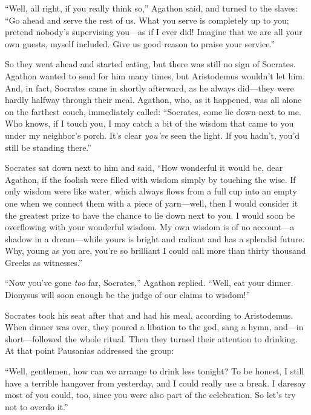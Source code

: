 “Well, all right, if you really think so,” Agathon said, and turned to
the slaves: “Go ahead and serve the rest of us. What you serve is
completely up to you; pretend nobody’s supervising you---as if I ever
did! Imagine that we are all your own guests, myself included. Give us
good reason to praise your service.”

So they went ahead and started eating, but there was still no sign of
Socrates. Agathon wanted to send for him many times, but Aristodemus
wouldn’t let him. And, in fact, Socrates came in shortly afterward, as
he always did---they were hardly halfway through their meal. Agathon,
who, as it happened, was all alone on the farthest couch, immediately
called: “Socrates, come lie down next to me. Who knows, if I touch you,
I may catch a bit of the wisdom that came to you under my
neighbor’s porch. It’s clear {\em you’ve} seen the light. If you hadn’t,
you’d still be standing there.”

Socrates sat down next to him and said, “How wonderful it would be, dear
Agathon, if the foolish were filled with wisdom simply by touching the
wise. If only wisdom were like water, which always flows from a full cup
into an empty one when we connect them with a piece of yarn---well, 
then I would consider it the greatest prize to have the chance
to lie down next to you. I would soon be overflowing with your wonderful
wisdom. My own wisdom is of no account---a shadow in a dream---while
yours is bright and radiant and has a splendid future. Why, young as you
are, you’re so brilliant I could call more than thirty thousand Greeks
as witnesses.”

“Now you’ve gone {\em too} far, Socrates,” Agathon replied. “Well, eat
your dinner. Dionysus will soon enough be the judge of our claims to
wisdom!”

Socrates took his seat after that and had his meal, according to
Aristodemus. When dinner was over, they poured a libation to the god,
sang a hymn, and---in short---followed the whole ritual. Then they
turned their attention to drinking. At that point Pausanias addressed
the group:

“Well, gentlemen, how can we arrange to drink less tonight? To be
honest, I still have a terrible hangover from yesterday, and I could
really use a break. I daresay most of you could, too, since you were
also part of the celebration. So let’s try not to overdo it.”

